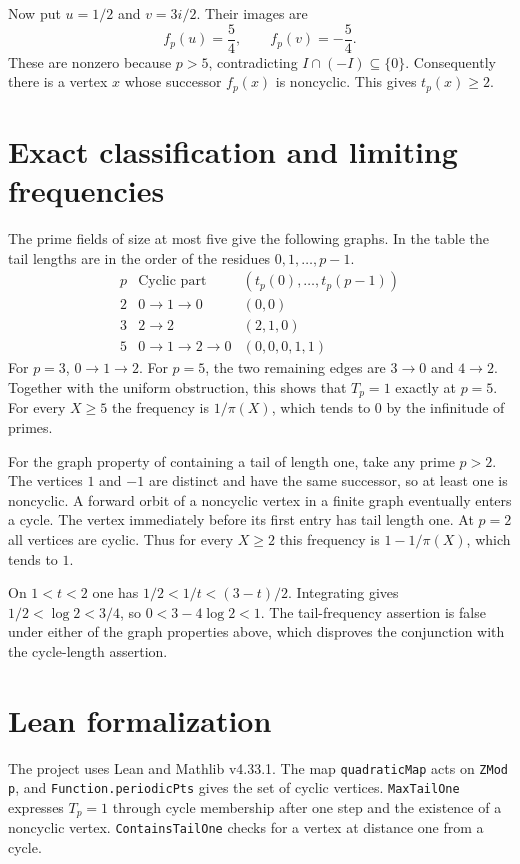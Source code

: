 \documentclass[11pt]{article}
\begin{document}
Now put $u=1/2$ and $v=3i/2$. Their images are
\[
  f_p(u)=\frac54,\qquad f_p(v)=-\frac54 .
\]
These are nonzero because $p>5$, contradicting $I\cap(-I)\subseteq\{0\}$.
Consequently there is a vertex $x$ whose successor $f_p(x)$ is
noncyclic. This gives $t_p(x)\ge2$.

\newpage

\section{Exact classification and limiting frequencies}
\label{sec:frequency}

The prime fields of size at most five give the following graphs.
In the table the tail lengths are in the order of the residues
$0,1,\ldots,p-1$.
\[
\begin{array}{c|l|c}
p & \text{Cyclic part} & (t_p(0),\ldots,t_p(p-1)) \\ \hline
2 & 0\to1\to0 & (0,0) \\
3 & 2\to2 & (2,1,0) \\
5 & 0\to1\to2\to0 & (0,0,0,1,1)
\end{array}
\]
For $p=3$, $0\to1\to2$. For $p=5$, the two remaining edges are
$3\to0$ and $4\to2$. Together with the uniform obstruction, this
shows that $T_p=1$ exactly at $p=5$. For every $X\ge5$ the frequency
is $1/\pi(X)$, which tends to $0$ by the infinitude of primes.

For the graph property of containing a tail of length one, take any
prime $p>2$. The vertices $1$ and $-1$ are distinct and have the same
successor, so at least one is noncyclic. A forward orbit of a
noncyclic vertex in a finite graph eventually enters a cycle. The
vertex immediately before its first entry has tail length one.
At $p=2$ all vertices are cyclic. Thus for every $X\ge2$ this
frequency is $1-1/\pi(X)$, which tends to $1$.

On $1<t<2$ one has $1/2<1/t<(3-t)/2$. Integrating gives
$1/2<\log 2<3/4$, so $0<3-4\log 2<1$. The tail-frequency assertion
is false under either of the graph properties above, which disproves
the conjunction with the cycle-length assertion.

\section{Lean formalization}

The project uses Lean and Mathlib v4.33.1. The map
\texttt{quadraticMap} acts on \texttt{ZMod p}, and
\texttt{Function.periodicPts} gives the set of cyclic vertices.
\texttt{MaxTailOne} expresses $T_p=1$ through cycle membership after
one step and the existence of a noncyclic vertex.
\texttt{ContainsTailOne} checks for a vertex at distance one from a cycle.
\end{document}
